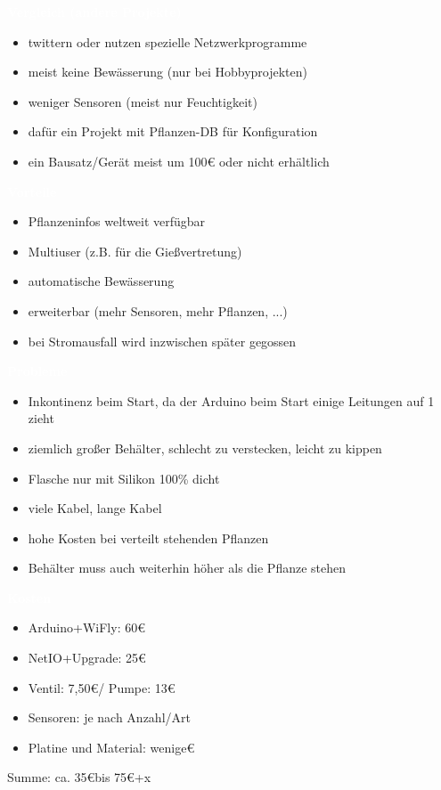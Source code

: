 \documentclass[bigger]{beamer}
\newcommand{\topic}[1]{{\huge{\textcolor{white}{\textbf{#1}}}}}
\begin{document}
\begin{frame}{\topic{Vergleich (andere Projekte)}}
	\begin{itemize}
		\item twittern oder nutzen spezielle Netzwerkprogramme
		\item meist keine Bewässerung (nur bei Hobbyprojekten)
		\item weniger Sensoren (meist nur Feuchtigkeit)
		\item dafür ein Projekt mit Pflanzen-DB für Konfiguration
		\item ein Bausatz/Gerät meist um {100\euro} oder nicht erhältlich
	\end{itemize}
\end{frame}

\begin{frame}{\topic{Vorteile}}
	\begin{itemize}
		\item Pflanzeninfos weltweit verfügbar
		\item Multiuser (z.B. für die Gießvertretung)
		\item automatische Bewässerung
		\item erweiterbar (mehr Sensoren, mehr Pflanzen, ...)
		\item bei Stromausfall wird inzwischen später gegossen
	\end{itemize}
\end{frame}

\begin{frame}{\topic{Probleme}}
	\begin{itemize}
		\item Inkontinenz beim Start, da der Arduino beim Start einige Leitungen auf 1 zieht
		\item ziemlich großer Behälter, schlecht zu verstecken, leicht zu kippen
		\item Flasche nur mit Silikon 100\% dicht
		\item viele Kabel, lange Kabel
		\item hohe Kosten bei verteilt stehenden Pflanzen
		\item Behälter muss auch weiterhin höher als die Pflanze stehen
	\end{itemize}
\end{frame}

\begin{frame}{\topic{Kosten}}
	\begin{itemize}
		\item Arduino+WiFly: 60\euro
		\item NetIO+Upgrade: 25\euro
		\item Ventil: 7,50\euro / Pumpe: 13\euro
		\item Sensoren: je nach Anzahl/Art
		\item Platine und Material: wenige\euro
	\end{itemize}
	Summe: ca. 35\euro  bis 75\euro  +x
\end{frame}
\end{document}

